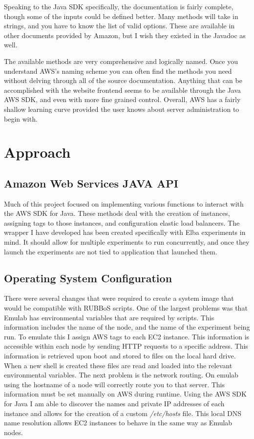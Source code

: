 \documentclass{article}
\begin{document}
Speaking to the Java SDK specifically, the documentation is fairly complete, though some of the inputs could be defined better. Many methods will take in strings, and you have to know the list of valid options. These are available in other documents provided by Amazon, but I wish they existed in the Javadoc as well.

The available methods are very comprehensive and logically named. Once you understand AWS's naming scheme you can often find the methods you need without delving through all of the source documentation. Anything that can be accomplished with the website frontend seems to be available through the Java AWS SDK, and even with more fine grained control. Overall, AWS has a fairly shallow learning curve provided the user knows about server administration to begin with.
\section{Approach}
\subsection{Amazon Web Services JAVA API}
Much of this project focused on implementing various functions to interact with  the AWS SDK for Java. These methods deal with the creation of instances, assigning tags to those instances, and configuration elastic load balancers. The wrapper I have developed has been created specifically with Elba experiments in mind. It should allow for multiple experiments to run concurrently, and once they launch the experiments are not tied to application that launched them.
\subsection{Operating System Configuration}
There were several changes that were required to create a system image that would be compatible with RUBBoS scripts. One of the largest problems was that Emulab has environmental variables that are required by scripts. This information includes the name of the node, and the name of the experiment being run. To emulate this I assign AWS tags to each EC2 instance. This information is accessible within each node by sending HTTP requests to a specific address\cite{metaDataRetr}.
This information is retrieved upon boot and stored to files on the local hard drive. When a new shell is created these files are read and loaded into the relevant environmental variables.
The next problem is the network routing. On emulab using the hostname of a node will correctly route you to that server. This information must be set manually on AWS during runtime. Using the AWS SDK for Java I am able to discover the names and private IP addresses of each instance and allows for the creation of a custom {\it/etc/hosts} file. This local DNS name resolution allows EC2 instances to behave in the same way as Emulab nodes.
\end{document}
